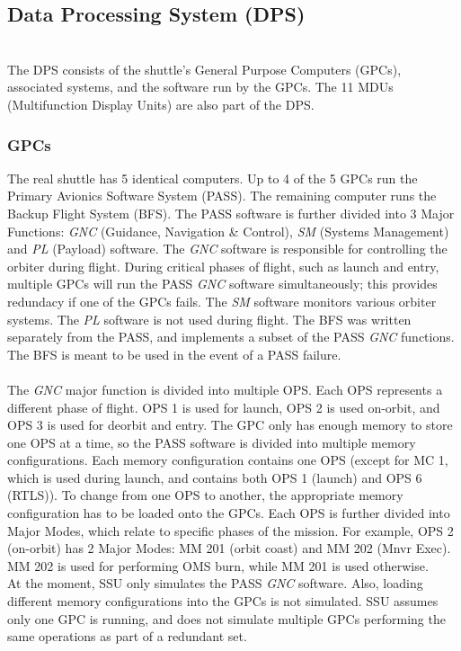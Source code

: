 \documentclass[Space_Shuttle_Ultra_Manual.tex]{subfiles}
\begin{document}
\subsection{Data Processing System (DPS)}
\begin{multicols*}{2}
\renewcommand{\cfttoctitlefont}{\bf}
\localtableofcontents
\noindent
\\
The DPS consists of the shuttle's General Purpose Computers (GPCs), associated systems, and the software run by the GPCs. The 11 MDUs (Multifunction Display Units) are also part of the DPS.
\subsubsection{GPCs}
The real shuttle has 5 identical computers. Up to 4 of the 5 GPCs run the Primary Avionics Software System (PASS). The remaining computer runs the Backup Flight System (BFS). The PASS software is further divided into 3 Major Functions: \textit{GNC} (Guidance, Navigation \& Control), \textit{SM} (Systems Management) and \textit{PL} (Payload) software. The \textit{GNC} software is responsible for controlling the orbiter during flight. During critical phases of flight, such as launch and entry, multiple GPCs will run the PASS \textit{GNC} software simultaneously; this provides redundacy if one of the GPCs fails. The \textit{SM} software monitors various orbiter systems. The \textit{PL} software is not used during flight. The BFS was written separately from the PASS, and implements a subset of the PASS \textit{GNC} functions. The BFS is meant to be used in the event of a PASS failure. \\
\\
The \textit{GNC} major function is divided into multiple OPS. Each OPS represents a different phase of flight. OPS 1 is used for launch, OPS 2 is used on-orbit, and OPS 3 is used for deorbit and entry. The GPC only has enough memory to store one OPS at a time, so the PASS software is divided into multiple memory configurations. Each memory configuration contains one OPS (except for MC 1, which is used during launch, and contains both OPS 1 (launch) and OPS 6 (RTLS)). To change from one OPS to another, the appropriate memory configuration has to be loaded onto the GPCs.
Each OPS is further divided into Major Modes, which relate to specific phases of the mission. For example, OPS 2 (on-orbit) has 2 Major Modes: MM 201 (orbit coast) and MM 202 (Mnvr Exec). MM 202 is used for performing OMS burn, while MM 201 is used otherwise.
\\
At the moment, SSU only simulates the PASS \textit{GNC} software. Also, loading different memory configurations into the GPCs is not simulated. SSU assumes only one GPC is running, and does not simulate multiple GPCs performing the same operations as part of a redundant set.

\end{multicols*}
\end{document}
